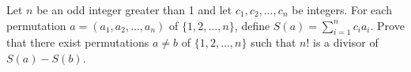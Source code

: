 Let $n$ be an odd integer greater than 1 and let $c_1, c_2, \ldots, c_n$ be integers. For each permutation $a = (a_1, a_2, \ldots, a_n)$ of $\{1,2,\ldots,n\}$,  define $S(a) = \sum_{i=1}^n c_i a_i$. Prove that there exist permutations $a \neq b$ of $\{1,2,\ldots,n\}$ such that $n!$ is a divisor of $S(a)-S(b)$.